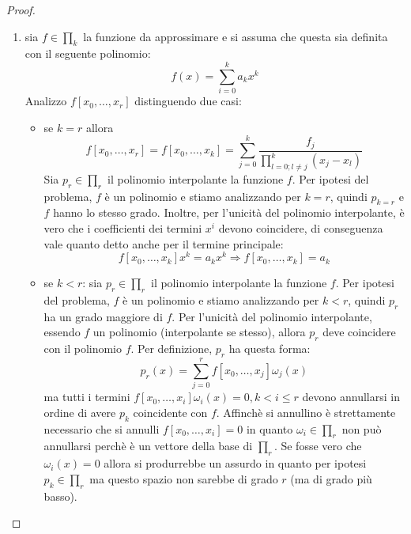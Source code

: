 \begin{proof}
\begin{enumerate}
  \item sia $f \in \prod_{k}$ la funzione da approssimare e si assuma che
  questa sia definita con il seguente polinomio:
  \begin{displaymath}
  	f(x) = \sum_{i = 0}^{k}{a_{k}x^{k}}
  \end{displaymath}
  Analizzo $f[x_{0}, \ldots, x_{r}]$ distinguendo due casi:
  \begin{itemize}
    \item se $k = r$ allora 
    \begin{displaymath}
    	f[x_{0}, \ldots, x_{r}] = f[x_{0}, \ldots, x_{k}] = 
    	\sum_{j = 0}^{k}{
  		\frac{f_{j}}{\prod_{l = 0;l \not = j}^{k}{(x_{j} - x_{l})}}}
    \end{displaymath}
    Sia $p_{r}\in \prod_{r}$ il polinomio interpolante la funzione
    $f$. Per ipotesi del problema, $f$ \`e un polinomio e stiamo analizzando
    per $k = r$, quindi $p_{k = r}$ e $f$ hanno lo stesso grado. Inoltre, per
    l'unicit\`a del polinomio interpolante, \`e vero che i coefficienti dei
    termini $x^{i}$ devono coincidere, di conseguenza vale quanto detto anche
    per il termine principale:
    \begin{displaymath}
    	f[x_{0}, \ldots, x_{k}] x^{k} = 
  		a_{k}x^{k} \Rightarrow f[x_{0}, \ldots, x_{k}] = a_{k} 
    \end{displaymath}
    
    \item se $k < r$: 
    sia $p_{r}\in \prod_{r}$ il polinomio interpolante la funzione $f$.
    Per ipotesi del problema, $f$ \`e un polinomio e stiamo analizzando
    per $k < r$, quindi $p_{r}$ ha un grado maggiore di $f$. 
    Per l'unicit\`a del polinomio interpolante, essendo $f$ un
    polinomio (interpolante se stesso), allora $p_{r}$ deve coincidere con il 
    polinomio $f$. Per definizione, $p_{r}$ ha questa forma:
    \begin{displaymath}
    	p_{r}(x) = \sum_{j = 0}^{r}{f[x_{0}, \ldots, x_{j}] \omega_{j}(x)}
    \end{displaymath}
    ma tutti i termini $f[x_{0}, \ldots, x_{i}] \omega_{i}(x) = 0, k < i \leq r$
    devono annullarsi in ordine di avere $p_{k}$ coincidente con $f$. Affinch\`e
    si annullino \`e strettamente necessario che si annulli $f[x_{0}, \ldots,
    x_{i}] = 0$ in quanto $\omega_{i} \in \prod_{r}$ non pu\`o annullarsi
    perch\`e \`e un vettore della base di $\prod_{r}$. Se fosse vero che
    $\omega_{i}(x) = 0$ allora si produrrebbe un assurdo in quanto per ipotesi 
    $p_{k} \in \prod_{r}$ ma questo spazio non sarebbe di grado $r$ (ma di grado
    pi\`u basso).
  \end{itemize}
  

\end{enumerate}
\end{proof}
